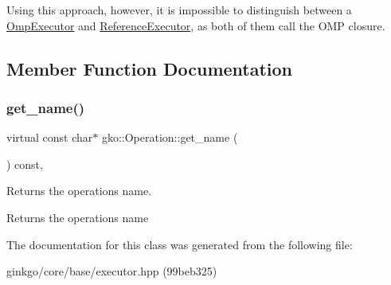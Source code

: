 Using this approach, however, it is impossible to distinguish between a \hyperlink{classgko_1_1OmpExecutor}{Omp\+Executor} and \hyperlink{classgko_1_1ReferenceExecutor}{Reference\+Executor}, as both of them call the O\+MP closure. 

\subsection{Member Function Documentation}
\mbox{\label{classgko_1_1Operation_ab3b940849d1daf02830f3387c52888d0}} 
\subsubsection{\texorpdfstring{get\+\_\+name()}{get\_name()}}
{\footnotesize\ttfamily virtual const char$\ast$ gko\+::\+Operation\+::get\+\_\+name (\begin{DoxyParamCaption}{ }\end{DoxyParamCaption}) const\hspace{0.3cm}{\ttfamily [virtual]}, {\ttfamily [noexcept]}}



Returns the operation\textquotesingle{}s name. 

\begin{DoxyReturn}{Returns}
the operation\textquotesingle{}s name 
\end{DoxyReturn}


The documentation for this class was generated from the following file\+:\begin{DoxyCompactItemize}
\item 
ginkgo/core/base/executor.\+hpp (99beb325)\end{DoxyCompactItemize}
